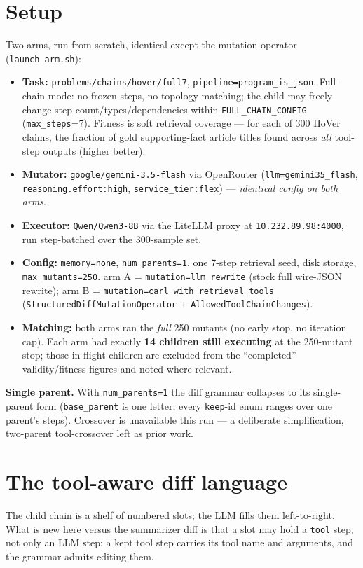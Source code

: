 \documentclass[11pt]{article}
\newcommand{\armA}{\textcolor{bad}{arm A}}
\newcommand{\armB}{\textcolor{accent}{arm B}}
\begin{document}
\section{Setup}
\label{sec:setup}
Two arms, run from scratch, identical except the mutation operator (\texttt{launch\_arm.sh}):
\begin{itemize}
  \item \textbf{Task:} \texttt{problems/chains/hover/full7}, \texttt{pipeline=program\_is\_json}.
  Full-chain mode: no frozen steps, no topology matching; the child may freely change step
  count/types/dependencies within \texttt{FULL\_CHAIN\_CONFIG} (\texttt{max\_steps}=7). Fitness
  is soft retrieval coverage --- for each of 300 HoVer claims, the fraction of gold
  supporting-fact article titles found across \emph{all} tool-step outputs (higher better).
  \item \textbf{Mutator:} \texttt{google/gemini-3.5-flash} via OpenRouter
  (\texttt{llm=gemini35\_flash}, \texttt{reasoning.effort:high}, \texttt{service\_tier:flex})
  --- \emph{identical config on both arms}.
  \item \textbf{Executor:} \texttt{Qwen/Qwen3-8B} via the LiteLLM proxy at
  \texttt{10.232.89.98:4000}, run step-batched over the 300-sample set.
  \item \textbf{Config:} \texttt{memory=none}, \texttt{num\_parents=1}, one 7-step retrieval
  seed, disk storage, \texttt{max\_mutants=250}. \armA{} = \texttt{mutation=llm\_rewrite}
  (stock full wire-JSON rewrite); \armB{} = \texttt{mutation=carl\_with\_retrieval\_tools}
  (\texttt{StructuredDiffMutationOperator} + \texttt{AllowedToolChainChanges}).
  \item \textbf{Matching:} both arms ran the \emph{full} 250 mutants (no early stop, no
  iteration cap). Each arm had exactly \textbf{14 children still executing} at the 250-mutant
  stop; those in-flight children are excluded from the ``completed'' validity/fitness figures
  and noted where relevant.
\end{itemize}

\noindent\textbf{Single parent.} With \texttt{num\_parents=1} the diff grammar collapses to its
single-parent form (\texttt{base\_parent} is one letter; every \texttt{keep}-id enum ranges
over one parent's steps). Crossover is unavailable this run --- a deliberate simplification,
two-parent tool-crossover left as prior work.

\section{The tool-aware diff language}
\label{sec:language}
The child chain is a shelf of numbered slots; the LLM fills them left-to-right. What is new
here versus the summarizer diff is that a slot may hold a \texttt{tool} step, not only an LLM
step: a kept tool step carries its tool name and arguments, and the grammar admits editing them.
\end{document}
